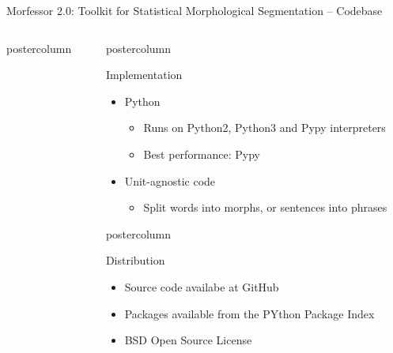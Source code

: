\documentclass[final]{beamer} %
\begin{document}
\begin{frame}{Morfessor 2.0: Toolkit for Statistical Morphological Segmentation -- Codebase}
\begin{columns}
\begin{column}{.3\textwidth}
\begin{beamercolorbox}[center,wd=\textwidth]{postercolumn}
	\end{beamercolorbox}
\end{column}

\begin{column}{.3\textwidth}
  \begin{beamercolorbox}[center,wd=\textwidth]{postercolumn}
 \begin{block}{Implementation}
              \begin{itemize}
              \item Python
		
                \begin{itemize}
                \item Runs on Python2, Python3 and Pypy interpreters
		\item Best performance: Pypy
                \end{itemize}
              \item Unit-agnostic code
                \begin{itemize}
                \item Split words into morphs, or sentences into phrases
                \end{itemize}
              \end{itemize}              
            \end{block}
            
	\end{beamercolorbox}
\vfill
  \begin{beamercolorbox}[center,wd=\textwidth]{postercolumn}
 \begin{block}{Distribution}
              \begin{itemize}
              \item Source code availabe at GitHub
		\item Packages available from the PYthon Package Index
              \item BSD Open Source License
\end{itemize}
            \end{block}
            

\end{beamercolorbox}
\end{column}
\end{columns}
\end{frame}
\end{document}
